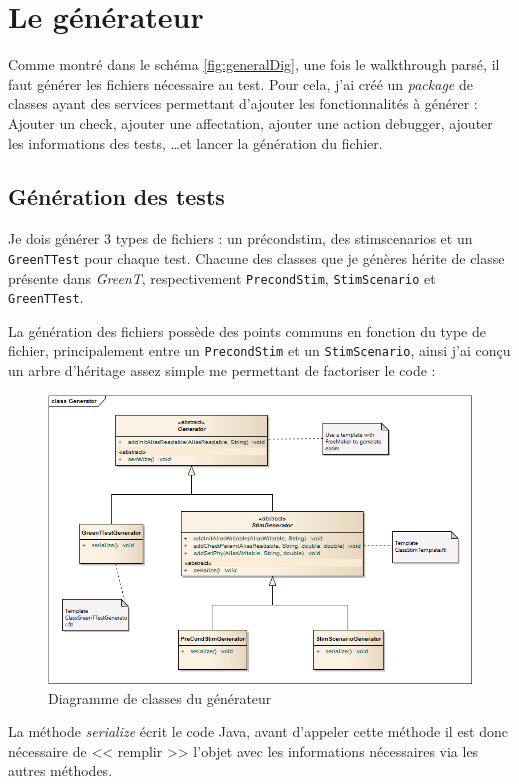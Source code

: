 	\section{Le générateur}
	Comme montré dans le schéma \ref{fig:generalDig}, une fois le walkthrough parsé, il faut générer les fichiers nécessaire au test. Pour cela, j'ai créé un \textit{package} de classes ayant des services permettant d'ajouter les fonctionnalités à générer : Ajouter un check, ajouter une affectation, ajouter une action debugger, ajouter les informations des tests, \ldots et lancer la génération du fichier.

		\subsection{Génération des tests}
		Je dois générer 3 types de fichiers : un précondstim, des stimscenarios et un \texttt{GreenTTest} pour chaque test. Chacune des classes que je génères hérite de classe présente dans \textit{GreenT}, respectivement \texttt{PrecondStim}, \texttt{StimScenario} et \texttt{GreenTTest}.

		La génération des fichiers possède des points communs en fonction du type de fichier, principalement entre un \texttt{PrecondStim} et un \texttt{StimScenario}, ainsi j'ai conçu un arbre d'héritage assez simple me permettant de factoriser le code : 
		\begin{figure}[H]
		\centering
		\includegraphics[width=14cm]{contents/images/generatorClass.png}
		\caption{Diagramme de classes du générateur}
		\end{figure}
		La méthode \textit{serialize} écrit le code Java, avant d'appeler cette méthode il est donc nécessaire de << remplir >> l'objet avec les informations nécessaires via les autres méthodes.
		
